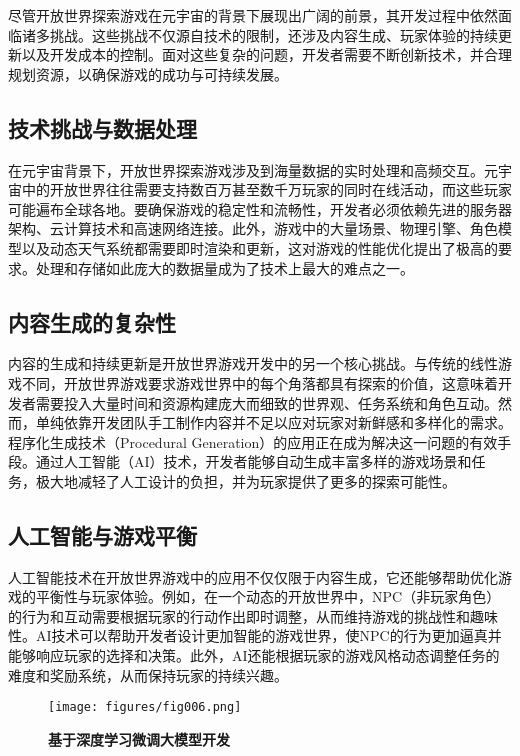 \documentclass[UTF8]{ctexart}
\begin{document}
	尽管开放世界探索游戏在元宇宙的背景下展现出广阔的前景，其开发过程中依然面临诸多挑战。这些挑战不仅源自技术的限制，还涉及内容生成、玩家体验的持续更新以及开发成本的控制。面对这些复杂的问题，开发者需要不断创新技术，并合理规划资源，以确保游戏的成功与可持续发展。
	
	\subsection{技术挑战与数据处理}
	
	在元宇宙背景下，开放世界探索游戏涉及到海量数据的实时处理和高频交互。元宇宙中的开放世界往往需要支持数百万甚至数千万玩家的同时在线活动，而这些玩家可能遍布全球各地。要确保游戏的稳定性和流畅性，开发者必须依赖先进的服务器架构、云计算技术和高速网络连接\cite{yang2022cloudgaming}。此外，游戏中的大量场景、物理引擎、角色模型以及动态天气系统都需要即时渲染和更新，这对游戏的性能优化提出了极高的要求。处理和存储如此庞大的数据量成为了技术上最大的难点之一。
	
	\subsection{内容生成的复杂性}
	
	内容的生成和持续更新是开放世界游戏开发中的另一个核心挑战\cite{yamashita2022procedural}。与传统的线性游戏不同，开放世界游戏要求游戏世界中的每个角落都具有探索的价值，这意味着开发者需要投入大量时间和资源构建庞大而细致的世界观、任务系统和角色互动。然而，单纯依靠开发团队手工制作内容并不足以应对玩家对新鲜感和多样化的需求。程序化生成技术（Procedural Generation）的应用正在成为解决这一问题的有效手段。通过人工智能（AI）技术，开发者能够自动生成丰富多样的游戏场景和任务，极大地减轻了人工设计的负担，并为玩家提供了更多的探索可能性\cite{silva2022gamerneeds}。
	
	\subsection{人工智能与游戏平衡}
	
	人工智能技术在开放世界游戏中的应用不仅仅限于内容生成，它还能够帮助优化游戏的平衡性与玩家体验。例如，在一个动态的开放世界中，NPC（非玩家角色）的行为和互动需要根据玩家的行动作出即时调整，从而维持游戏的挑战性和趣味性\cite{grigore2021vrgames}。AI技术可以帮助开发者设计更加智能的游戏世界，使NPC的行为更加逼真并能够响应玩家的选择和决策。此外，AI还能根据玩家的游戏风格动态调整任务的难度和奖励系统，从而保持玩家的持续兴趣。
	
	\begin{figure}[htbp] %
		\centering %
		\texttt{[image: figures/fig006.png]} %
		\caption{\textbf{基于深度学习微调大模型开发}} %
		\label{fig:6} %
	\end{figure}
	
\end{document}
